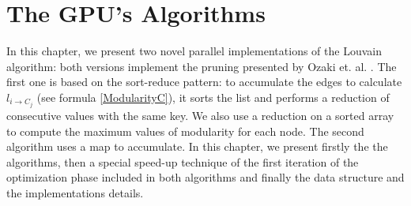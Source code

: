 \section{The GPU's Algorithms}
In this chapter, we present two novel parallel implementations of the Louvain algorithm: both versions implement the pruning presented by Ozaki et. al. \cite{pruning}. The first one is based on the sort-reduce pattern:
to accumulate the edges to calculate $l_{i\rightarrow C_j}$  (see formula \ref{ModularityC}),  it sorts the list and performs a reduction of consecutive values with the same key.  We also use a reduction on a sorted array to compute the maximum values of modularity for each node. 
The second algorithm uses a map to accumulate.
In this chapter, we present firstly the the algorithms, then a special speed-up technique of the first iteration of the optimization phase included in both algorithms and finally the data structure and the implementations details.

